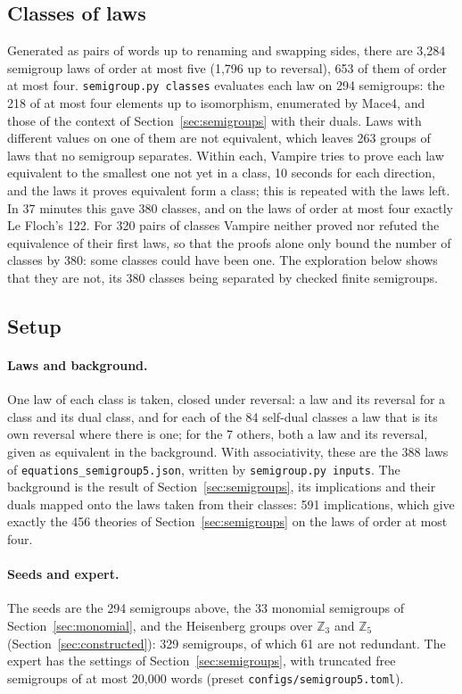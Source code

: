 \documentclass[11pt,a4paper]{article}
\theoremstyle{definition}
\theoremstyle{remark}
\newcommand{\code}[1]{\texttt{#1}}
\begin{document}
\subsection{Classes of laws}

Generated as pairs of words up to renaming and swapping sides, there are 3,284 semigroup laws of order at most five (1,796 up to reversal), 653 of them of order at most four. \code{semigroup.py classes} evaluates each law on 294 semigroups: the 218 of at most four elements up to isomorphism, enumerated by Mace4, and those of the context of Section~\ref{sec:semigroups} with their duals. Laws with different values on one of them are not equivalent, which leaves 263 groups of laws that no semigroup separates. Within each, Vampire tries to prove each law equivalent to the smallest one not yet in a class, 10 seconds for each direction, and the laws it proves equivalent form a class; this is repeated with the laws left. In 37 minutes this gave 380 classes, and on the laws of order at most four exactly Le Floch's 122. For 320 pairs of classes Vampire neither proved nor refuted the equivalence of their first laws, so that the proofs alone only bound the number of classes by 380: some classes could have been one. The exploration below shows that they are not, its 380 classes being separated by checked finite semigroups.

\subsection{Setup}

\paragraph{Laws and background.} One law of each class is taken, closed under reversal: a law and its reversal for a class and its dual class, and for each of the 84 self-dual classes a law that is its own reversal where there is one; for the 7 others, both a law and its reversal, given as equivalent in the background. With associativity, these are the 388 laws of \code{equations\_semigroup5.json}, written by \code{semigroup.py inputs}. The background is the result of Section~\ref{sec:semigroups}, its implications and their duals mapped onto the laws taken from their classes: 591 implications, which give exactly the 456 theories of Section~\ref{sec:semigroups} on the laws of order at most four.

\paragraph{Seeds and expert.} The seeds are the 294 semigroups above, the 33 monomial semigroups of Section~\ref{sec:monomial}, and the Heisenberg groups over $\mathbb{Z}_3$ and $\mathbb{Z}_5$ (Section~\ref{sec:constructed}): 329 semigroups, of which 61 are not redundant. The expert has the settings of Section~\ref{sec:semigroups}, with truncated free semigroups of at most 20,000 words (preset \code{configs/semigroup5.toml}).
\end{document}
